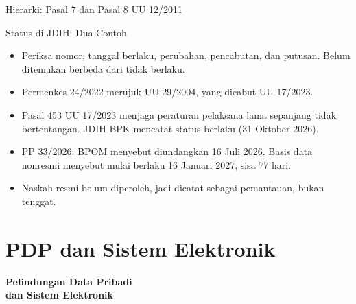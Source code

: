 \documentclass[aspectratio=169, table, 12pt]{beamer}
\begin{document}
\begin{frame}{{\Large Hierarki: Pasal 7 dan Pasal 8 UU 12/2011}}
  \centering
  \resizebox{!}{0.76\textheight}{}
\end{frame}

\begin{frame}{{\Large Status di JDIH: Dua Contoh}}
  \vspace{4pt}
  \small
  \begin{itemize}
    \item Periksa nomor, tanggal berlaku, perubahan, pencabutan, dan putusan. Belum ditemukan berbeda
          dari tidak berlaku.
    \item Permenkes 24/2022 merujuk UU 29/2004, yang dicabut UU 17/2023.
    \item Pasal 453 UU 17/2023 menjaga peraturan pelaksana lama sepanjang tidak bertentangan. JDIH BPK
          mencatat status berlaku (31 Oktober 2026).
    \item PP 33/2026: BPOM menyebut diundangkan 16 Juli 2026. Basis data nonresmi menyebut mulai
          berlaku 16 Januari 2027, sisa 77 hari.
    \item Naskah resmi belum diperoleh, jadi dicatat sebagai pemantauan, bukan tenggat.
  \end{itemize}
\end{frame}

\section{PDP dan Sistem Elektronik}

\begin{frame}{\hfill}
  \centering
  \Huge{\textbf{Pelindungan Data Pribadi\\dan Sistem Elektronik}}
\end{frame}
\end{document}
